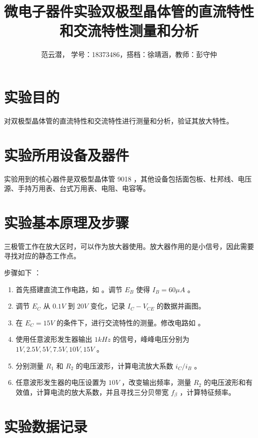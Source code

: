 \documentclass[lang=cn,11pt,a4paper,cite=authoryear]{elegantpaper}
\title{微电子器件实验\quad 双极型晶体管的直流特性和交流特性测量和分析}
\author{范云潜， 学号：18373486，搭档：徐靖涵，教师：彭守仲}
\institute{微电子学院 184111 班}
\date{\zhdate{2020/10/19}}
\begin{document}
\maketitle


\section{实验目的}

对双极型晶体管的直流特性和交流特性进行测量和分析，验证其放大特性。

\section{实验所用设备及器件}


实验用到的核心器件是双极型晶体管 9018 ，其他设备包括面包板、杜邦线、电压源、手持万用表、台式万用表、电阻、电容等。

\section{实验基本原理及步骤}

三极管工作在放大区时，可以作为放大器使用。放大器作用的是小信号，因此需要寻找对应的静态工作点。

步骤如下 ：

\begin{enumerate}
    \item 首先搭建直流工作电路，如  。调节 \(E_B\) 使得 \(I_B = 60 \mu A \) 。
    \item 调节 \(E_C\) 从 \(0.1 V\) 到 \(20 V\) 变化，记录 \(I_C - V_{CE}\) 的数据并画图。
    \item 在 \(E_C = 15 V\) 的条件下，进行交流特性的测量。修改电路如  。
    \item 使用任意波形发生器输出 \(1 kHz\) 的信号，峰峰电压分别为 \(1 V, 2.5 V, 5 V, 7.5 V, 10 V, 15 V\) 。
    \item 分别测量 \(R_1\) 和 \(R_2\) 的电压波形，计算电流放大系数 \(i_C/i_B\) 。
    \item 任意波形发生器的电压设置为 \(10 V\) ，改变输出频率，测量 \(R_2\) 的电压波形和有效值，计算电流的放大系数，并且寻找三分贝带宽 \(f_\beta\) ，计算特征频率。
\end{enumerate}



\section{实验数据记录}
\end{document}
